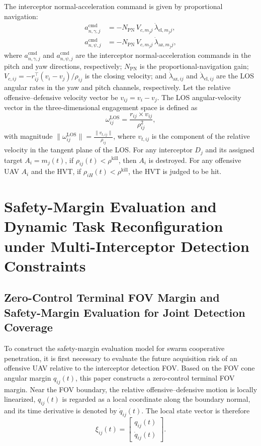 \documentclass{cja}
\begin{document}
The interceptor normal-acceleration command is given by proportional navigation:
\begin{equation}
\begin{aligned}
a_{n,\gamma,j}^{\mathrm{cmd}}
&=-N_{\mathrm{PN}}\,V_{c,m_j j}\,\dot\lambda_{\mathrm{el},m_j j},\\
a_{n,\psi,j}^{\mathrm{cmd}}
&=-N_{\mathrm{PN}}\,V_{c,m_j j}\,\dot\lambda_{\mathrm{az},m_j j},
\end{aligned}
\label{eq:def-guid-pn}
\end{equation}
where $a_{n,\gamma,j}^{\mathrm{cmd}}$ and $a_{n,\psi,j}^{\mathrm{cmd}}$ are the interceptor normal-acceleration commands in the pitch and yaw directions, respectively; $N_{\mathrm{PN}}$ is the proportional-navigation gain; $V_{c,ij}=-r_{ij}^\top(v_i-v_j)/\rho_{ij}$ is the closing velocity; and $\dot\lambda_{\mathrm{az},ij}$ and $\dot\lambda_{\mathrm{el},ij}$ are the LOS angular rates in the yaw and pitch channels, respectively.
Let the relative offensive--defensive velocity vector be $v_{ij}=v_i-v_j$. The LOS angular-velocity vector in the three-dimensional engagement space is defined as
\begin{equation}
\omega_{ij}^{\mathrm{LOS}} = \frac{r_{ij}\times v_{ij}}{\rho_{ij}^2},
\label{eq:omega_ij_def}
\end{equation}
with magnitude $\|\omega_{ij}^{\mathrm{LOS}}\| = \frac{\|v_{t,ij}\|}{\rho_{ij}}$, where $v_{t,ij}$ is the component of the relative velocity in the tangent plane of the LOS.
For any interceptor $D_j$ and its assigned target $A_i=m_j(t)$, if $\rho_{ij}(t)<\rho^{\mathrm{kill}}$, then $A_i$ is destroyed. For any offensive UAV $A_i$ and the HVT, if $\rho_{iH}(t)<\rho^{\mathrm{kill}}$, the HVT is judged to be hit.

\section{Safety-Margin Evaluation and Dynamic Task Reconfiguration under Multi-Interceptor Detection Constraints}

\subsection{Zero-Control Terminal FOV Margin and Safety-Margin Evaluation for Joint Detection Coverage}

To construct the safety-margin evaluation model for swarm cooperative penetration, it is first necessary to evaluate the future acquisition risk of an offensive UAV relative to the interceptor detection FOV. Based on the FOV cone angular margin $q_{ij}(t)$, this paper constructs a zero-control terminal FOV margin. Near the FOV boundary, the relative offensive--defensive motion is locally linearized, $q_{ij}(t)$ is regarded as a local coordinate along the boundary normal, and its time derivative is denoted by $\dot q_{ij}(t)$. The local state vector is therefore
\begin{equation}
\xi_{ij}(t)=
\begin{bmatrix}
q_{ij}(t)\\
\dot q_{ij}(t)
\end{bmatrix}.
\end{equation}
\end{document}
